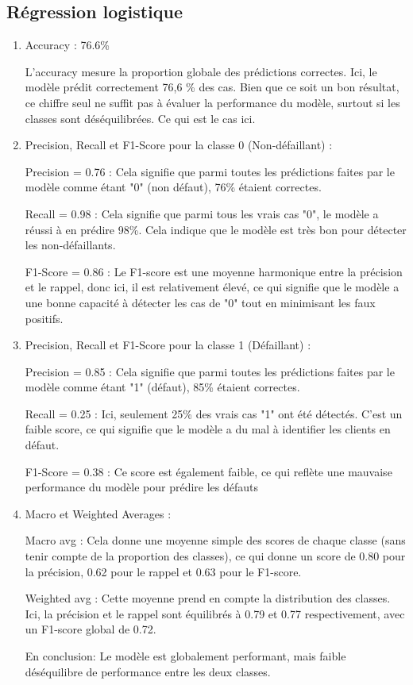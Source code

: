 \subsection{Régression logistique}
\begin{flushleft}
\begin{enumerate}
\item Accuracy : 76.6\%

L'accuracy mesure la proportion globale des prédictions correctes. Ici, le modèle prédit correctement 76,6 \% des cas. Bien que ce soit un bon résultat, ce chiffre seul ne suffit pas à évaluer la performance du modèle, surtout si les classes sont déséquilibrées. Ce qui est le cas ici.

\item Precision, Recall et F1-Score pour la classe 0 (Non-défaillant) :

Precision = 0.76 : Cela signifie que parmi toutes les prédictions faites par le modèle comme étant "0" (non défaut), 76\% étaient correctes.

Recall = 0.98 : Cela signifie que parmi tous les vrais cas "0", le modèle a réussi à en prédire 98\%. Cela indique que le modèle est très bon pour détecter les non-défaillants.

F1-Score = 0.86 : Le F1-score est une moyenne harmonique entre la précision et le rappel, donc ici, il est relativement élevé, ce qui signifie que le modèle a une bonne capacité à détecter les cas de "0" tout en minimisant les faux positifs.

\item Precision, Recall et F1-Score pour la classe 1 (Défaillant) :

Precision = 0.85 : Cela signifie que parmi toutes les prédictions faites par le modèle comme étant "1" (défaut), 85\% étaient correctes.

Recall = 0.25 : Ici, seulement 25\% des vrais cas "1" ont été détectés. C'est un faible score, ce qui signifie que le modèle a du mal à identifier les clients en défaut.

F1-Score = 0.38 : Ce score est également faible, ce qui reflète une mauvaise performance du modèle pour prédire les défauts

\item Macro et Weighted Averages :

Macro avg : Cela donne une moyenne simple des scores de chaque classe (sans tenir compte de la proportion des classes), ce qui donne un score de 0.80 pour la précision, 0.62 pour le rappel et 0.63 pour le F1-score.

Weighted avg : Cette moyenne prend en compte la distribution des classes. Ici, la précision et le rappel sont équilibrés à 0.79 et 0.77 respectivement, avec un F1-score global de 0.72.

En conclusion:
Le modèle est globalement performant, mais faible déséquilibre de performance entre les deux classes.
\end{enumerate}
\end{flushleft}

